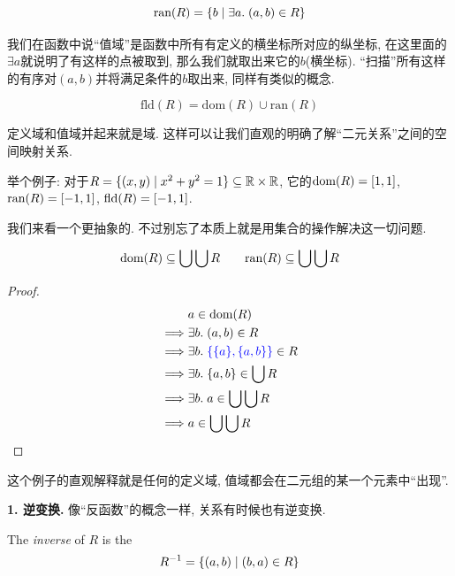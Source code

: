 \begin{definition}[值域 (Range)]
  \[
    \text{ran}(R) = \{b \mid \exists a.\; (a,b) \in R\}
  \]
\end{definition}

我们在函数中说``值域''是函数中所有有定义的横坐标所对应的纵坐标, 在这里面的$\exists a$就说明了有这样的点被取到, 那么我们就取出来它的$b$(横坐标). ``扫描''所有这样的有序对$(a,b)$并将满足条件的$b$取出来, 同样有类似的概念. 

\begin{definition}[域 (Field)]
  \[
    \text{fld}(R) = \text{dom}(R) \cup \text{ran}(R)
  \]
\end{definition}

定义域和值域并起来就是域. 这样可以让我们直观的明确了解``二元关系''之间的空间映射关系. 

举个例子: 对于$R = \{(x, y) \mid x^2 + y^2 = 1\} \subseteq \mathbb{R} \times \mathbb{R}$, 它的$\text{dom}(R) = [1, 1]$, $\text{ran}(R) = [-1, 1]$, $\text{fld}(R) = [-1, 1]$. 

我们来看一个更抽象的. 不过别忘了本质上就是用集合的操作解决这一切问题. 

\begin{theorem}
  \[
    \text{dom}(R) \subseteq \bigcup \bigcup R \qquad
    \text{ran}(R) \subseteq \bigcup \bigcup R
  \]
\end{theorem}

\begin{proof}
    \begin{align*}
      &a \in \text{dom}(R) \\
      \implies& \exists b.\; (a, b) \in R \\
      \implies& \exists b.\; \textcolor{blue}{\{\{a\}, \{a, b\}\}} \in R \\
      \implies& \exists b.\; \{a, b\} \in \bigcup R \\
      \implies& \exists b.\; a \in \bigcup\bigcup R \\
      \implies& a \in \bigcup\bigcup R
    \end{align*}
\end{proof}

这个例子的直观解释就是任何的定义域, 值域都会在二元组的某一个元素中``出现''. 


\textbf{1. 逆变换. }像``反函数''的概念一样, 关系有时候也有逆变换. 

\begin{definition}[逆 (Inverse)]
  The {\it inverse} of $R$ is the 
  \[
    R^{-1} = \{(a, b) \mid (b, a) \in R\}
  \]
\end{definition}


